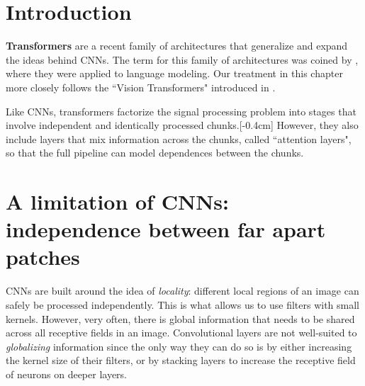 \section{Introduction}

{\bf Transformers} are a recent family of architectures that generalize and expand the ideas behind CNNs. The term for this family of architectures was coined by \cite{vaswani2017attention}, where they were applied to language modeling. Our treatment in this chapter more closely follows the ``Vision Transformers" introduced in \cite{dosovitskiy2020vit}.%

Like CNNs, transformers factorize the signal processing problem into stages that involve independent and identically processed chunks.[-0.4cm] However, they also include layers that mix information across the chunks, called ``attention layers", so that the full pipeline can model dependences between the chunks. %



\section{A limitation of CNNs: independence between far apart patches}
CNNs are built around the idea of \textit{locality}: different local regions of an image can safely be processed independently. This is what allows us to use filters with small kernels. However, very often, there is global information that needs to be shared across all receptive fields in an image. Convolutional layers are not well-suited to \textit{globalizing} information since the only way they can do so is by either increasing the kernel size of their filters, or by stacking layers to increase the receptive field of neurons on deeper layers.

